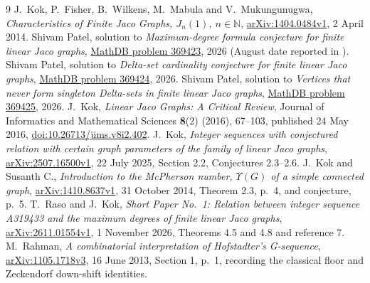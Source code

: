\documentclass[11pt]{article}
\begin{document}
\begin{thebibliography}{9}
 J.~Kok, P.~Fisher, B.~Wilkens, M.~Mabula and
V.~Mukungunugwa, \emph{Characteristics of Finite Jaco Graphs,
$J_n(1)$, $n\in\mathbb N$},
\href{https://arxiv.org/abs/1404.0484v1}{arXiv:1404.0484v1}, 2 April 2014.
 Shivam Patel, solution to \emph{Maximum-degree formula
conjecture for finite linear Jaco graphs},
\href{https://mathdb.com/p/369423/maximum-degree-formula-conjecture-for-finite-linear-jaco-gra}{MathDB problem 369423},
2026 (August date reported in \cite[reference 7]{raso}).
 Shivam Patel, solution to \emph{Delta-set cardinality
conjecture for finite linear Jaco graphs},
\href{https://mathdb.com/p/369424/delta-set-cardinality-conjecture-for-finite-linear-jaco-grap}{MathDB problem 369424},
2026.
 Shivam Patel, solution to \emph{Vertices that never
form singleton Delta-sets in finite linear Jaco graphs},
\href{https://mathdb.com/p/369425/vertices-that-never-form-singleton-delta-sets-in-finite-line}{MathDB problem 369425},
2026.
 J.~Kok, \emph{Linear Jaco Graphs: A Critical Review},
Journal of Informatics and Mathematical Sciences \textbf{8}(2) (2016),
67--103, published 24 May 2016,
\href{https://doi.org/10.26713/jims.v8i2.402}{doi:10.26713/jims.v8i2.402}.
 J.~Kok, \emph{Integer sequences with conjectured
relation with certain graph parameters of the family of linear Jaco graphs},
\href{https://arxiv.org/abs/2507.16500v1}{arXiv:2507.16500v1},
22 July 2025, Section 2.2, Conjectures 2.3--2.6.
 J.~Kok and Susanth C.,
\emph{Introduction to the McPherson number, $\Upsilon(G)$ of a simple connected graph},
\href{https://arxiv.org/abs/1410.8637v1}{arXiv:1410.8637v1},
31 October 2014, Theorem 2.3, p.~4, and conjecture, p.~5.
 T.~Raso and J.~Kok,
\emph{Short Paper No.~1: Relation between integer sequence A319433 and the
maximum degrees of finite linear Jaco graphs},
\href{https://arxiv.org/abs/2611.01554v1}{arXiv:2611.01554v1},
1 November 2026, Theorems 4.5 and 4.8 and reference 7.
 M.~Rahman,
\emph{A combinatorial interpretation of Hofstadter's G-sequence},
\href{https://arxiv.org/abs/1105.1718v3}{arXiv:1105.1718v3},
16 June 2013, Section 1, p.~1, recording the classical floor and
Zeckendorf down-shift identities.
\end{thebibliography}
\end{document}
